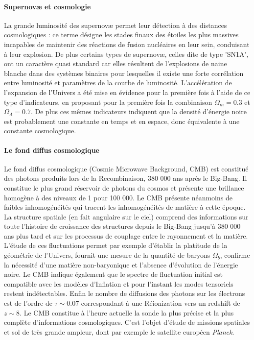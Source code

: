 \paragraph{Supernovæ et cosmologie}
La grande luminosité des supernovæ permet leur détection à des distances cosmologiques : ce terme désigne les stades finaux des étoiles les plus massives incapables de maintenir des réactions de fusion nucléaires en leur sein, conduisant à leur explosion. De plus certains types de supernovæ, celles dite de type 'SN1A', ont un caractère quasi standard car elles résultent de l'explosions de naine blanche dans des systèmes binaires pour lesquelles il existe une forte corrélation entre luminosité et paramètres de la courbe de luminosité. L'accélération  de l'expansion de l'Univers a été mise en évidence pour la première fois à l'aide de ce type d'indicateurs, en proposant pour la première fois la combinaison $\Omega_m=0.3$ et $\Omega_\Lambda=0.7$. De plus ces mêmes indicateurs indiquent que la densité d'énergie noire est probablement une constante en temps et en espace, donc équivalente à une constante cosmologique.

\paragraph{Le fond diffus cosmologique}
Le fond diffus cosmologique (Cosmic Microwave Background, CMB) est constitué des photons produits lors de la Recombinaison, 380 000 ans après le Big-Bang. Il constitue le plus grand réservoir de photons du cosmos et présente une brillance homogène à des niveaux de 1 pour 100 000. Le CMB présente néanmoins de faibles inhomogénéités qui tracent les inhomogénéités de matière à cette époque. La structure spatiale (en fait angulaire sur le ciel) comprend des informations sur toute l'histoire de croissance des structures depuis le Big-Bang jusqu'à 380 000 ans plus tard et sur les processus de couplage entre le rayonnement et la matière. L'étude de ces fluctuations permet par exemple d'établir la platitude de la géométrie de l'Univers, fournit une mesure de la quantité de baryons $\Omega_b$, confirme la nécessité d'une matière non-baryonique et l'absence d'évolution de l'énergie noire. Le CMB indique également que le spectre de fluctuation initial est compatible avec les modèles d'Inflation  et pour l'instant les modes tensoriels restent indétectables. Enfin le nombre de diffusions  des photons sur les électrons est de l'ordre de $\tau\sim 0.07$ correspondant à une Réionization vers un redshift de $z\sim8$. Le CMB constitue à l'heure actuelle la sonde la plus précise et la plus complète d'informations cosmologiques. C'est l'objet d'étude de missions spatiales et sol de très grande ampleur, dont par exemple le satellite européen \textit{Planck}.

